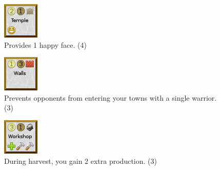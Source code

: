 \documentclass[11pt,a4paper,titlepage]{article}
\begin{document}
{  \begin{figure}[!htb]
    \begin{minipage}[c]{0.1\textwidth}
      \includegraphics[scale=.7]{doe_building_temple.png}
    \end{minipage}\hfill
    \begin{minipage}[c]{0.7\textwidth}
      \captionsetup{labelformat=empty, justification=justified, singlelinecheck=false}
      \caption{Provides 1 happy face. (4)}
    \end{minipage}\hfill
    \label{fig:building_temple}
  \end{figure}

  \begin{figure}[!htb]
    \begin{minipage}[c]{0.1\textwidth}
      \includegraphics[scale=.7]{doe_building_walls.png}
    \end{minipage}\hfill
    \begin{minipage}[c]{0.7\textwidth}
      \captionsetup{labelformat=empty, justification=justified, singlelinecheck=false}
      \caption{Prevents opponents from entering your towns with a single warrior. (3)}
    \end{minipage}\hfill
    \label{fig:building_walls}
  \end{figure}

  \begin{figure}[!htb]
    \begin{minipage}[c]{0.1\textwidth}
      \includegraphics[scale=.7]{doe_building_workshop.png}
    \end{minipage}\hfill
    \begin{minipage}[c]{0.7\textwidth}
      \captionsetup{labelformat=empty, justification=justified, singlelinecheck=false}
      \caption{During harvest, you gain 2 extra production. (3)}
    \end{minipage}\hfill
    \label{fig:building_workshop}
  \end{figure}

}\label{sec:city_improvement_tiles}
\end{document}
